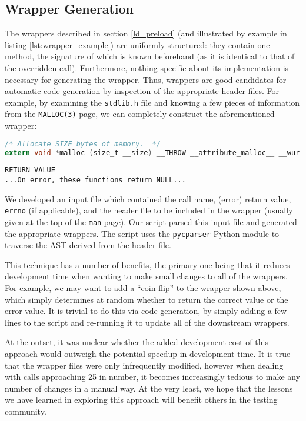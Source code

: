 \subsection{Wrapper Generation}
The wrappers described in section \ref{ld_preload} (and illustrated by example in listing \ref{lst:wrapper_example}) are uniformly structured: they contain one method, the signature of which is known beforehand (as it is identical to that of the overridden call). Furthermore, nothing specific about its implementation is necessary for generating the wrapper. Thus, wrappers are good candidates for automatic code generation by inspection of the appropriate header files. For example, by examining the \texttt{stdlib.h} file and knowing a few pieces of information from the \texttt{MALLOC(3)} page, we can completely construct the aforementioned wrapper:

\begin{lstlisting}[caption=Excerpt from \texttt{/usr/include/stdlib.h}, language=C]
/* Allocate SIZE bytes of memory.  */
extern void *malloc (size_t __size) __THROW __attribute_malloc__ __wur;
\end{lstlisting}

\begin{lstlisting}[caption=Excerpt from \texttt{MALLOC(3)}]
RETURN VALUE
...On error, these functions return NULL...
\end{lstlisting}

We developed an input file which contained the call name, (error) return value, \texttt{errno} (if applicable), and the header file to be included in the wrapper (usually given at the top of the \texttt{man} page). Our script parsed this input file and generated the appropriate wrappers. The script uses the \texttt{pycparser} Python module \cite{pycparser} to traverse the AST derived from the header file.

This technique has a number of benefits, the primary one being that it reduces development time when wanting to make small changes to all of the wrappers. For example, we may want to add a ``coin flip'' to the wrapper shown above, which simply determines at random whether to return the correct value or the error value. It is trivial to do this via code generation, by simply adding a few lines to the script and re-running it to update all of the downstream wrappers.

At the outset, it was unclear whether the added development cost of this approach would outweigh the potential speedup in development time. It is true that the wrapper files were only infrequently modified, however when dealing with calls approaching 25 in number, it becomes increasingly tedious to make any number of changes in a manual way. At the very least, we hope that the lessons we have learned in exploring this approach will benefit others in the testing community.